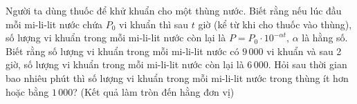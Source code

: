 \begin{bt}%
	Người ta dùng thuốc để khử khuẩn cho một thùng nước. Biết rằng nếu lúc đầu mỗi mi-li-lit nước chứa $P_{0}$ vi khuẩn thì sau $t$ giờ (kể từ khi cho thuốc vào thùng), số lượng vi khuẩn trong mỗi mi-li-lit nước còn lại là $P=P_{0} \cdot 10^{-\alpha t}, \,\alpha$ là hằng số. Biết rằng số lượng vi khuẩn trong mỗi mi-li-lit nước có $9\,000$ vi khuẩn và sau 2 giờ, số lượng vi khuẩn trong mỗi mi-li-lit nước còn lại là $6\,000$. Hỏi sau thời gian bao nhiêu phút thì số lượng vi khuẩn trong mỗi mi-li-lit nước trong thùng ít hơn hoặc bằng $1\,000$? (Kết quả làm tròn đến hằng đơn vị)
	
\end{bt}
